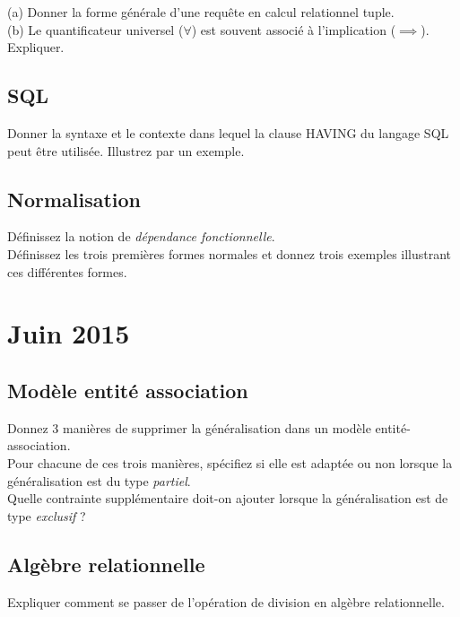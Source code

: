 (a) Donner la forme générale d'une requête en calcul relationnel tuple.\\
(b) Le quantificateur universel ($\forall$) est souvent associé à l'implication 
($\implies$). Expliquer.

\subsection{SQL}
Donner la syntaxe et le contexte dans lequel la clause HAVING du langage SQL peut être 
utilisée. Illustrez par un exemple.

\subsection{Normalisation}
Définissez la notion de \textit{dépendance fonctionnelle}. \\
Définissez les trois premières formes normales et donnez trois exemples 
illustrant ces différentes formes.

\section{Juin 2015}

\subsection{Modèle entité association}

Donnez 3 manières de supprimer la généralisation dans un modèle entité-association.\\
Pour chacune de ces trois manières, spécifiez si elle est adaptée ou non lorsque la 
généralisation est du type \textit{partiel}.\\
Quelle contrainte supplémentaire doit-on ajouter lorsque la généralisation est 
de type \textit{exclusif} ?

\subsection{Algèbre relationnelle}
Expliquer comment se passer de l'opération de division en algèbre relationnelle.

